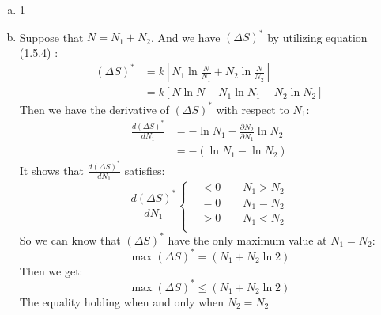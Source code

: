 \documentclass{article}
\begin{document}
    \begin{enumerate}[(a)]

        \item   1

        \item   Suppose that $N=N_1+N_2$. And we have $\left(\Delta S \right)^*$ by utilizing equation (1.5.4) :
                \begin{equation}
                \begin{aligned}
                    \left(\Delta S \right)^*&=k\left[N_1 \ln \frac{N}{N_1}+N_2 \ln \frac{N}{N_2} \right]\\
                                            &=k\left[N \ln N- N_1 \ln N_1 -N_2 \ln N_2 \right]
                \end{aligned}
                \end{equation}
                Then we have the derivative of $\left(\Delta S \right)^*$ with respect to $N_1$:
                \begin{equation}
                \begin{aligned}
                    \frac{d \left(\Delta S \right)^*}{d N_1}&=-\ln N_1-\frac{\partial N_2}{\partial N_1}\ln N_2\\
                                                            &=-\left(\ln N_1-\ln N_2\right)
                \end{aligned}
                \end{equation}
                It shows that $\frac{d \left(\Delta S \right)^*}{d N_1}$ satisfies:
                \begin{equation}
                \frac{d \left(\Delta S \right)^*}{d N_1}
                    \left\{
                \begin{aligned}
                    &<0 \qquad  N_1>N_2\\
                    &=0 \qquad  N_1=N_2\\
                    &>0 \qquad  N_1<N_2\\
                \end{aligned}
                    \right.
                \end{equation}
                So we can know that $\left(\Delta S \right)^*$ have the only maximum value at $N_1=N_2$:
                \begin{equation}
                    \max \left(\Delta S \right)^*=\left(N_1+N_2\ln 2\right)
                \end{equation}
                Then we get:
                \begin{equation}
                    \max \left(\Delta S \right)^*\leq\left(N_1+N_2\ln 2\right)
                \end{equation}
                The equality holding when and only when $N_2=N_2$   
    \end{enumerate}
\end{document}
